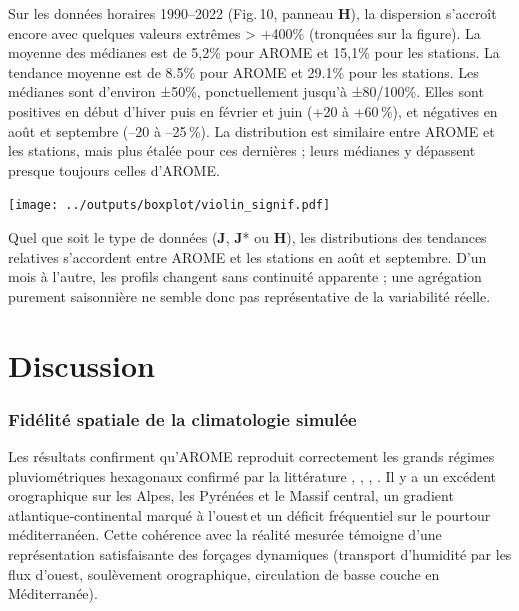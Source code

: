\documentclass[
  article,
  nofooter,
  noheadings]{jss}
\begin{document}
Sur les données horaires 1990--2022 (Fig.\,10, panneau \textbf{H}), la
dispersion s'accroît encore avec quelques valeurs extrêmes
\textgreater{} +400\% (tronquées sur la figure). La moyenne des médianes
est de 5,2\% pour AROME et 15,1\% pour les stations. La tendance moyenne
est de 8.5\% pour AROME et 29.1\% pour les stations. Les médianes sont
d'environ ±50\%, ponctuellement jusqu'à ±80/100\%. Elles sont positives
en début d'hiver puis en février et juin (+20 à +60\,\%), et négatives
en août et septembre (--20 à --25\,\%). La distribution est similaire
entre AROME et les stations, mais plus étalée pour ces dernières ; leurs
médianes y dépassent presque toujours celles d'AROME.

\texttt{[image: ../outputs/boxplot/violin\_signif.pdf]}


\hfill\break

Quel que soit le type de données (\textbf{J}, \textbf{J}* ou
\textbf{H}), les distributions des tendances relatives s'accordent entre
AROME et les stations en août et septembre. D'un mois à l'autre, les
profils changent sans continuité apparente ; une agrégation purement
saisonnière ne semble donc pas représentative de la variabilité réelle.

\section{Discussion}\label{discussion}

\subsubsection{Fidélité spatiale de la climatologie
simulée}\label{fiduxe9lituxe9-spatiale-de-la-climatologie-simuluxe9e}

Les résultats confirment qu'AROME reproduit correctement les grands
régimes pluviométriques hexagonaux confirmé par la littérature
\citep{Fumiere2020}, \citep{caillaud2021simulation},
\citep{hess-28-2579-2024}, \citep{LucasPicher2024}. Il y a un excédent
orographique sur les Alpes, les Pyrénées et le Massif central, un
gradient atlantique‑continental marqué à l'ouest\,et un déficit
fréquentiel sur le pourtour méditerranéen. Cette cohérence avec la
réalité mesurée témoigne d'une représentation satisfaisante des forçages
dynamiques (transport d'humidité par les flux d'ouest, soulèvement
orographique, circulation de basse couche en Méditerranée).
\end{document}
